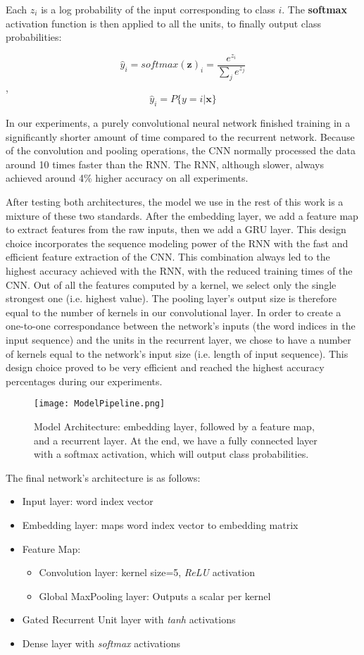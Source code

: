 Each  $z_i$ is a log probability of the input corresponding to class $i$. The \textbf{softmax} activation function is then applied to
all the units, to finally output class probabilities:

\[\hat{y}_i = softmax(\bm{z})_i = \frac{e^{z_i}}{\sum_j e^{z_j}}\],
\[\hat{y}_i = P\{y=i|\bm{x}\}\]

In our experiments, a purely convolutional neural network finished training in a significantly shorter amount of time compared to the recurrent network.
Because of the convolution and pooling operations, the CNN normally processed the data around 10 times faster than the RNN. The RNN, although slower,
always achieved around 4\% higher accuracy on all experiments.

After testing both architectures, the model we use in the rest of this work is a mixture of these two standards.
After the embedding layer, we add a feature map to extract features from the raw inputs,
then we add a GRU layer. This design choice incorporates the sequence modeling power of the RNN with the fast and efficient feature extraction of the CNN.
This combination always led to the highest accuracy achieved with the RNN, with the reduced training times of the CNN. Out of all the features computed by a kernel, we select only the single strongest one
(i.e. highest value). The pooling layer's output size is therefore equal to the number of kernels in our convolutional layer. In order to create
a one-to-one correspondance between the network's inputs (the word indices in the input sequence) and the units in the recurrent layer, we chose to have
a number of kernels equal to the network's input size (i.e. length of input sequence).
This design choice proved to be very efficient and reached the highest accuracy percentages during our experiments.

\begin{figure}[H]
\centering
\texttt{[image: ModelPipeline.png]}
\caption{Model Architecture: embedding layer, followed by a feature map, and a recurrent layer. At the end, we have
a fully connected layer with a softmax activation, which will output class probabilities.}
\end{figure}

The final network's architecture is as follows:
\begin{itemize}
  \item Input layer: word index vector
  \item Embedding layer: maps word index vector to embedding matrix
  \item Feature Map:
      \begin{itemize}
        \item Convolution layer: kernel size=5, \textit{ReLU} activation
        \item Global MaxPooling layer: Outputs a scalar per kernel
      \end{itemize}
\item Gated Recurrent Unit layer with \textit{tanh} activations
\item Dense layer with \textit{softmax} activations
\end{itemize}
